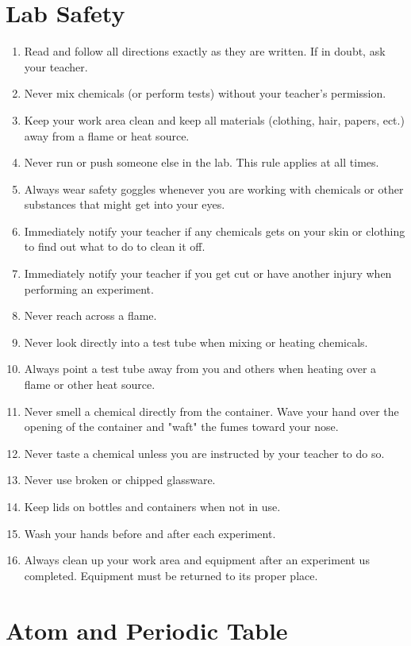 \documentclass[12pt]{article}
\begin{document}
\section{Lab Safety}
\begin{enumerate}
    \item Read and follow all directions exactly as they are written. If in doubt, ask your teacher.
    \item Never mix chemicals (or perform tests) without your teacher's permission.
    \item Keep your work area clean and keep all materials (clothing, hair, papers, ect.) away from a flame or heat source.
    \item Never run or push someone else in the lab. This rule applies at all times.
    \item Always wear safety goggles whenever you are working with chemicals or other substances that might get into your eyes.
    \item Immediately notify your teacher if any chemicals gets on your skin or clothing to find out what to do to clean it off.
    \item Immediately notify your teacher if you get cut or have another injury when performing an experiment.
    \item Never reach across a flame.
    \item Never look directly into a test tube when mixing or heating chemicals.
    \item Always point a test tube away from you and others when heating over a flame or other heat source.
    \item Never smell a chemical directly from the container. Wave your hand over the opening of the container and "waft" the fumes toward your nose.
    \item Never taste a chemical unless you are instructed by your teacher to do so.
    \item Never use broken or chipped glassware.
    \item Keep lids on bottles and containers when not in use.
    \item Wash your hands before and after each experiment.
    \item Always clean up your work area and equipment after an experiment us completed. Equipment must be returned to its proper place.
\end{enumerate}
\section{Atom and Periodic Table}
\end{document}
